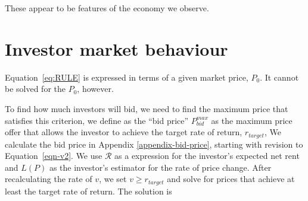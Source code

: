 These appear to be features of the economy we observe.

%
%


\section{Investor market behaviour}
Equation~\ref{eq:RULE} is expressed in terms of a given market price, $P_0$. It cannot be solved for the $P_0$, however.

To find how much investors will bid, we need to find the maximum price that satisfies this criterion, we define as the ``bid price'' $P^{max}_{bid}$  as the maximum price offer that allows the investor to achieve the target rate of return, $r_{target}$,   %
We calculate the bid price in Appendix \ref{appendix-bid-price}, starting with revision to Equation~\ref{eqn-v2}. We use $\mathcal{R}$ as a  expression for the investor's expected net rent and $L(P)$ as the investor's  estimator for the rate of price change. After recalculating the rate of $v$, we set $v \ge r_{target}$ and solve for  prices that achieve at least the target rate of return. The solution is 

